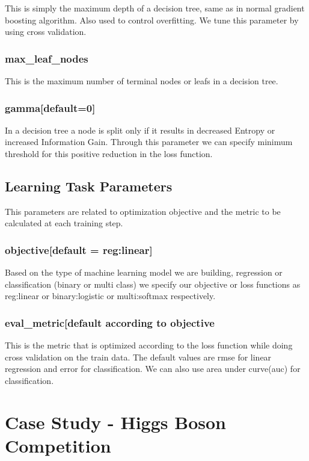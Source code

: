 This is simply the maximum depth of a decision tree, same as in normal gradient boosting 
algorithm. Also used to control overfitting. We tune this parameter by using cross validation.

\subsubsection{max\_leaf\_nodes}

This is the maximum number of terminal nodes or leafs in a decision tree.

\subsubsection{gamma[default=0]} 

In a decision tree a node is split only if it results in decreased Entropy or increased 
Information Gain. Through this parameter  we can specify minimum threshold for this positive 
reduction in the loss function.

\subsection{Learning Task Parameters} 

This parameters are related to optimization objective and the metric to be calculated at
each training step.

\subsubsection{objective[default = reg:linear]}

Based on the type of machine learning model we are building, regression or classification
(binary or multi class) we specify our objective or loss functions as reg:linear or
binary:logistic or  multi:softmax respectively.

\subsubsection{eval\_metric[default according to objective}

This is the metric that is optimized according to the loss function while doing cross 
validation on the train data. The default values are rmse for linear regression and  error 
for classification. We can also use area under curve(auc) for classification.

\section{Case Study - Higgs Boson Competition}

